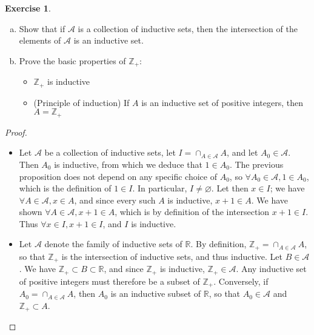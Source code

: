 \documentclass[11pt,a4paper,twoside]{article}
\theoremstyle{definition}
\newcounter{excounter}
\newtheorem{exercise}[excounter]{Exercise}
\begin{document}
\begin{exercise}\hfill

  \begin{enumerate}[(a)]

  \item Show that if $\mathscr{A}$ is a collection of inductive sets, then the intersection of the elements of $\mathscr{A}$ is an inductive set.
  \item Prove the basic properties of $\mathbb{Z}_+$:
    \begin{itemize}
    \item $\mathbb{Z}_+$ is inductive
    \item (Principle of induction) If $A$ is an inductive set of positive integers, then $A = \mathbb{Z}_+$
    \end{itemize}

  \end{enumerate}

\end{exercise}

\begin{proof}\hfill

  \begin{itemize}[(a)]

  \item Let $\mathscr{A}$ be a collection of inductive sets, let $I = \cap_{A \in \mathscr{A}} A$, and let $A_0 \in \mathscr{A}$. Then $A_0$ is inductive, from which we deduce that $1 \in A_0$.
    The previous proposition does not depend on any specific choice of $A_0$, so $\forall A_0 \in \mathscr{A}, 1 \in A_0$, which is the definition of $1 \in I$.
    In particular, $I \neq \varnothing$. Let then $x \in I$; we have $\forall A \in \mathscr{A}, x \in A$, and since every such $A$ is inductive,
    $x + 1 \in A$. We have shown $\forall A \in \mathscr{A}, x + 1 \in A$, which is by definition of the intersection $x + 1 \in I$. Thus $\forall x \in I, x + 1 \in I$, and $I$ is inductive.

  \item Let $\mathscr{A}$ denote the family of inductive sets of $\mathbb{R}$. By definition, $\mathbb{Z}_+ = \cap_{A \in \mathscr{A}} A$, so that $\mathbb{Z}_+$ is the intersection of inductive sets,
    and thus inductive.
    Let $B \in \mathscr{A}$. We have $\mathbb{Z}_+ \subset B \subset \mathbb{R}$, and since $\mathbb{Z}_+$ is inductive, $\mathbb{Z}_+ \in \mathscr{A}$.
    Any inductive set of positive integers must therefore be a subset of $\mathbb{Z}_+$.
    Conversely, if $A_0 = \cap_{A \in \mathscr{A}} A$, then $A_0$ is an inductive subset of $\mathbb{R}$, so that $A_0 \in \mathscr{A}$ and $\mathbb{Z}_+ \subset A$. \qedhere

  \end{itemize}

\end{proof}
\end{document}
